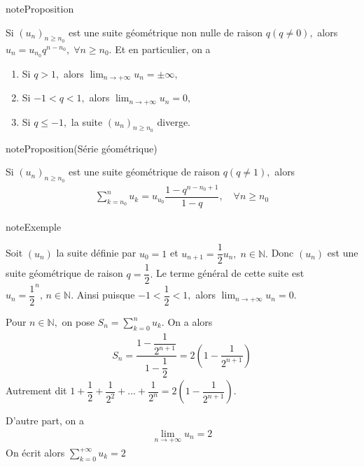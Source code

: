 \documentclass[letterpaper,10pt,french]{jupyterBook}
\begin{document}
\begin{sphinxadmonition}{note}{Proposition}

\sphinxAtStartPar
Si \((u_n)_{n\geq n_0}\) est une suite géométrique non nulle de raison \(q(q\neq0),\) alors \(u_n=u_{n_0}q^{n-n_0},\;\forall n\geq n_0.\) Et en particulier, on a
\begin{enumerate}
%
\item {} 
\sphinxAtStartPar
Si \(q>1,\) alors \(\lim_{n \rightarrow +\infty}u_n=\pm\infty,\)

\item {} 
\sphinxAtStartPar
Si \(-1<q<1,\) alors \(\lim_{n \rightarrow +\infty}u_n=0,\)

\item {} 
\sphinxAtStartPar
Si \(q\leq-1,\) la suite \((u_n)_{n\geq n_0}\) diverge.

\end{enumerate}
\end{sphinxadmonition}

\begin{sphinxadmonition}{note}{Proposition(Série géométrique)}

\sphinxAtStartPar
Si \((u_n)_{n\geq n_0}\) est une suite géométrique de raison \(q(q\neq1),\) alors
\begin{equation*}
\begin{split}
\sum_{k=n_0}^{n}u_k= u_{u_0}\dfrac{1-q^{n-n_0+1}}{1-q},\quad\forall n\geq n_0
\end{split}
\end{equation*}\end{sphinxadmonition}

\begin{sphinxadmonition}{note}{Exemple}

\sphinxAtStartPar
Soit \((u_n)\) la suite définie par \(u_0=1\) et \(u_{n+1}=\dfrac{1}{2}u_n, \; n\in \mathbb{N}.\) Donc \((u_n)\) est une suite géométrique de raison \(q=\dfrac{1}{2}.\) Le terme général de cette suite est \(u_n=\dfrac{1}{2}^n,\,n\in \mathbb{N}.\) Ainsi puisque \(-1<\dfrac{1}{2}<1,\) alors \(\lim_{n \rightarrow +\infty}u_n=0.\)

\sphinxAtStartPar
Pour \(n\in \mathbb{N},\) on pose \(S_n=\sum_{k=0}^{n}u_k.\) On a alors
\begin{equation*}
\begin{split}
S_n=\dfrac{1-\dfrac{1}{2^{n+1}}}{1-\dfrac{1}{2}}=2(1-\dfrac{1}{2^{n+1}})
\end{split}
\end{equation*}
\sphinxAtStartPar
Autrement dit \(1+\dfrac{1}{2}+\dfrac{1}{2^2}+...+\dfrac{1}{2^n}=2(1-\dfrac{1}{2^{n+1}}).\)

\sphinxAtStartPar
D’autre part, on a
\begin{equation*}
\begin{split}
\lim_{n \rightarrow +\infty}u_n=2
\end{split}
\end{equation*}
\sphinxAtStartPar
On écrit alors \(\sum_{k=0}^{+\infty}u_k=2\)
\end{sphinxadmonition}
\end{document}
